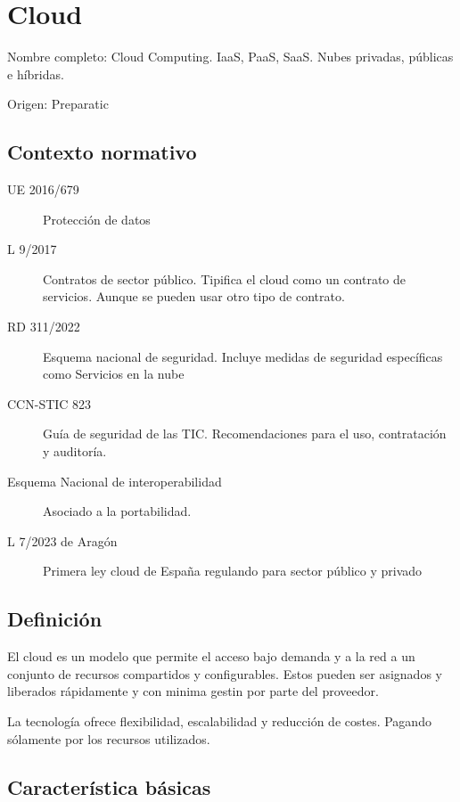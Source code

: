 \setcounter{section}{54} %
\section{Cloud}

Nombre completo: Cloud Computing. IaaS, PaaS, SaaS. Nubes privadas, públicas e híbridas.

Origen: Preparatic

\localtableofcontents

\subsection{Contexto normativo}
    \begin{description}
        \item[UE 2016/679] Protección de datos
        \item[L 9/2017] Contratos de sector público. Tipifica el cloud como un contrato de servicios. Aunque se pueden usar otro tipo de contrato.
        \item[RD 311/2022] Esquema nacional de seguridad. Incluye medidas de seguridad específicas como Servicios en la nube
        \item[CCN-STIC 823] Guía de seguridad de las TIC. Recomendaciones para el uso, contratación y auditoría.
        \item[Esquema Nacional de interoperabilidad] Asociado a la portabilidad.
        \item[L 7/2023 de Aragón] Primera ley cloud de España regulando para sector público y privado
    \end{description}

\subsection{Definición}

    El cloud es un modelo que permite el acceso bajo demanda y a  la red a un conjunto de recursos compartidos y configurables. Estos pueden ser asignados y liberados rápidamente y con minima gestin por parte del proveedor.

    La tecnología ofrece flexibilidad, escalabilidad y reducción de costes. Pagando sólamente por los recursos utilizados.

\subsection{Característica básicas}

